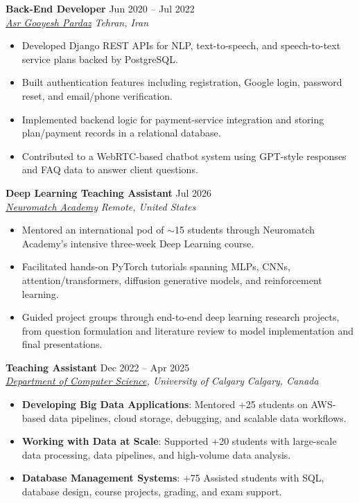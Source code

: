 \documentclass[a4paper,10pt]{article}
\newcommand{\resumeSubheading}[4]{
    \textbf{#1} \hfill #2 \\
    \textit{#3} \hfill \textit{#4}
}
\begin{document}
\resumeSubheading
{Back-End Developer}
{Jun 2020 -- Jul 2022}
{\href{https://asr-gooyesh.com/en/}{Asr Gooyesh Pardaz}}
{Tehran, Iran}
\begin{itemize}[leftmargin=0.25in]
    \item Developed Django REST APIs for NLP, text-to-speech, and speech-to-text service plans backed by PostgreSQL.
    \item Built authentication features including registration, Google login, password reset, and email/phone verification.
    \item Implemented backend logic for payment-service integration and storing plan/payment records in a relational database.
    \item Contributed to a WebRTC-based chatbot system using GPT-style responses and FAQ data to answer client questions.
\end{itemize}

\resumeSubheading
{Deep Learning Teaching Assistant}
{Jul 2026}
{\href{https://neuromatch.io/}{Neuromatch Academy}}
{Remote, United States}
\begin{itemize}[leftmargin=0.25in]
    \item Mentored an international pod of $\sim$15 students through Neuromatch Academy's intensive three-week Deep Learning course.
    \item Facilitated hands-on PyTorch tutorials spanning MLPs, CNNs, attention/transformers, diffusion generative models, and reinforcement learning.
    \item Guided project groups through end-to-end deep learning research projects, from question formulation and literature review to model implementation and final presentations.
\end{itemize}

\resumeSubheading
{Teaching Assistant}
{Dec 2022 -- Apr 2025}
{\href{https://science.ucalgary.ca/computer-science} {Department of Computer Science}, University of Calgary}
{Calgary, Canada}
\begin{itemize}[leftmargin=0.25in]
    \item \textbf{Developing Big Data Applications}: Mentored +25 students on AWS-based data pipelines, cloud storage, debugging, and scalable data workflows. 
    \item \textbf{Working with Data at Scale}: Supported +20 students with large-scale data processing, data pipelines, and high-volume data analysis. 
    \item \textbf{Database Management Systems}: +75 Assisted students with SQL, database design, course projects, grading, and exam support.
\end{itemize}
\end{document}
